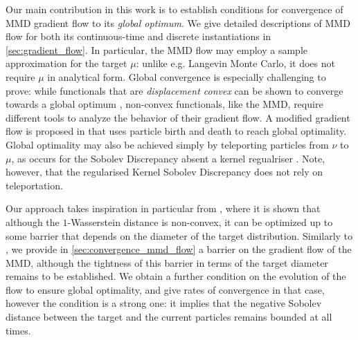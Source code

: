  



Our main contribution in this work is to establish conditions for convergence of MMD gradient flow to its {\em global optimum}.
We give detailed descriptions of  MMD flow for both its continuous-time and discrete instantiations in \cref{sec:gradient_flow}.
In particular, the MMD flow may employ a sample approximation for the target $\mu$: unlike e.g. Langevin Monte Carlo,
it does not require  $\mu$ in analytical form.
Global convergence is especially challenging to prove: while functionals  that are \textit{displacement convex} can be shown to converge towards a global optimum \cite{ambrosio2008gradient}, non-convex functionals, like the MMD,  require different tools to analyze the behavior of their gradient flow.
 A modified gradient flow is proposed in \cite{rotskoff2019global} that uses particle birth and death to reach global optimality.
Global optimality may also be achieved simply by teleporting particles from $\nu$ to $\mu$, as occurs for the Sobolev Discrepancy absent a kernel regualriser \cite[Theorem 4, Appendix D]{Mroueh:2019}.
Note, however, that the regularised Kernel Sobolev Discrepancy does not rely on teleportation.


\iffalse
We note the claim of \cite[Proposition 3, Appendix B.1]{Mroueh:2019} that global convergence may be achieved for a flow on the Kernel Sobolev Discrepancy, with no barrier (the regularised KSD is related to the MMD; see Introduction). This claim requires an assumption \cite[Assumption A]{Mroueh:2019} that amounts to assuming that the algorithm is not in a local minimum, however.\agnote{maybe add a short appendix section - although  it's not urgent.}

\fi



Our approach takes  inspiration in particular from \cite{Bottou:2017}, where it is shown that although the $1$-Wasserstein distance is non-convex, it can be optimized up to some barrier that depends on the diameter of the target distribution.
Similarly to \cite{Bottou:2017}, we provide in \cref{sec:convergence_mmd_flow} a barrier on the gradient flow of the MMD, although
the tightness of this barrier in terms of the target diameter remains to be established.
We  obtain a further condition on the evolution of the flow to ensure global optimality, and give rates of convergence in that case, however
the condition is a strong one: it implies that the negative Sobolev distance between the target and the current particles remains bounded at all times.

